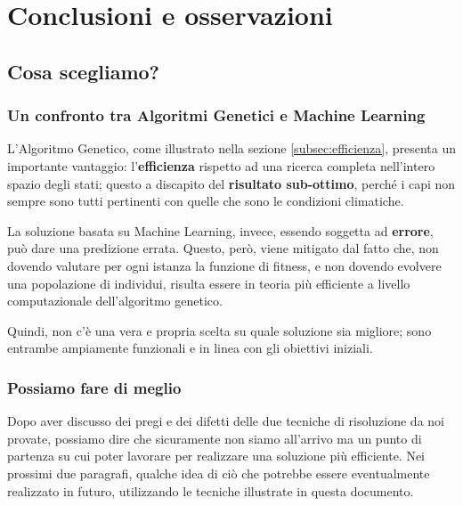 \documentclass[a4paper, 11pt, oneside]{report}
\begin{document}
    \part{Conclusioni e osservazioni}
        \chapter{Cosa scegliamo?}
            \section{Un confronto tra Algoritmi Genetici e Machine Learning}
                L'Algoritmo Genetico, come illustrato nella sezione \ref{subsec:efficienza}, presenta un importante vantaggio: l'\textbf{efficienza}
                rispetto ad una ricerca completa nell'intero spazio degli stati; questo a discapito del \textbf{risultato sub-ottimo},
                perché i capi non sempre sono tutti pertinenti con quelle che sono le condizioni climatiche.
                \par \noindent La soluzione basata su Machine Learning, invece, essendo soggetta ad
                \textbf{errore}, può dare una predizione errata. Questo, però, viene mitigato dal fatto che, non dovendo valutare
                per ogni istanza la funzione di fitness, e non dovendo evolvere una popolazione di individui, risulta essere
                in teoria più efficiente a livello computazionale dell'algoritmo genetico.
                \par \noindent Quindi, non c'è una vera e propria scelta su quale soluzione sia migliore; sono entrambe
                ampiamente funzionali e in linea con gli obiettivi iniziali.
            \section{Possiamo fare di meglio}
                Dopo aver discusso dei pregi e dei difetti delle due tecniche di risoluzione da noi provate, possiamo dire
                che sicuramente non siamo all'arrivo ma un punto di partenza su cui poter lavorare per realizzare una soluzione
                più efficiente.
                Nei prossimi due paragrafi, qualche idea di ciò che potrebbe essere eventualmente realizzato in futuro,
                utilizzando le tecniche illustrate in questa documento.
\end{document}
